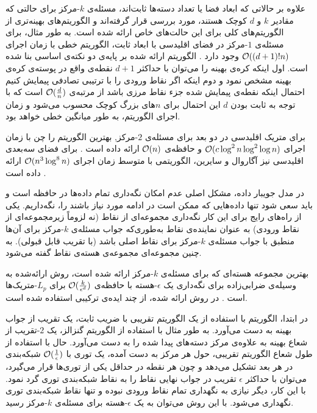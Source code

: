 علاوه بر حالاتی که ابعاد فضا یا تعداد دسته‌ها ثابت‌اند، مسئله‌ی $k$-مرکز برای حالتی که مقادیر $k$ و $d$ کوچک هستند، مورد بررسی قرار گرفته‌اند و الگوریتم‌های بهینه‌تری از الگوریتم‌های کلی برای این حالت‌های خاص ارائه شده است.
به طور مثال، برای مسئله‌ی $1$-مرکز در فضای اقلیدسی با ابعاد ثابت، الگوریتم خطی با زمان اجرای $\mathcal{O}((d+1)! n)$ وجود دارد .
الگوریتم ارائه شده بر پایه‌ی دو نکته‌ی اساسی بنا شده است.
اول اینکه کره‌ی بهینه را می‌توان با حداکثر $d+1$ نقطه‌ی واقع در پوسته‌ی کره‌ی بهینه مشخص نمود و دوم اینکه اگر نقاط ورودی را با ترتیبی تصادفی پیمایش کنیم احتمال اینکه نقطه‌ی پیمایش شده جزء نقاط مرزی باشد از مرتبه‌ی $\mathcal{O}(\frac{d}{n})$ است که با توجه به ثابت بودن $d$ این احتمال برای $n$های بزرگ کوچک محسوب می‌شود و زمان اجرای الگوریتم، به طور میانگین خطی خواهد بود. 


برای متریک اقلیدسی در دو بعد برای مسئله‌ی $2$-مرکز, بهترین الگوریتم را چن با زمان اجرای $\mathcal{O}(c \log^2{n} \log^2{\log{n}})$ و حافظه‌ی $\mathcal{O}(n)$ ارائه داده است .
برای فضای سه‌بعدی اقلیدسی نیز آگاروال و سایرین، الگوریتمی با متوسط زمان اجرای $\mathcal{O}(n^3\log^8{n})$ ارائه داده است .


در مدل جویبار داده، مشکل اصلی عدم امکان نگه‌داری تمام داده‌ها در حافظه است و باید سعی شود تنها داده‌هایی که ممکن است در ادامه مورد نیاز باشند را، نگه‌داریم.
یکی از راه‌های رایج برای این کار نگه‌داری مجموعه‌ای از نقاط (نه لزوماً زیرمجموعه‌ای از نقاط ورودی) به عنوان نماینده‌ی نقاط به‌طوری‌که جواب مسئله‌ی $k$-مرکز برای آن‌ها منطبق با جواب مسئله‌ی $k$-مرکز برای نقاط اصلی باشد (با تقریب قابل قبولی).
به چنین مجموعه‌ای مجموعه‌ی هسته‌ی نقاط گفته می‌شود. 

بهترین مجموعه هسته‌ای که برای مسئله‌ی $k$-مرکز ارائه شده است، روش ارائه‌شده به وسیله‌ی ضرابی‌زاده برای نگه‌داری یک $\epsilon$-هسته با حافظه‌ی $\mathcal{O}(\frac{k}{\epsilon^d})$ برای $L_p$-متریک‌ها است .
در روش ارائه شده، از چند ایده‌ی ترکیبی استفاده شده است. 

در ابتدا، الگوریتم با استفاده از یک الگوریتم تقریبی با ضریب ثابت، یک تقریب از جواب بهینه به دست می‌آورد.
به طور مثال با استفاده از الگوریتم گنزالز، یک $2$-تقریب از شعاع بهینه به علاوه‌ی مرکز دسته‌های پیدا شده را به دست می‌آورد.
حال با استفاده از طول شعاع الگوریتم تقریبی، حول هر مرکز به دست آمده، یک توری با $\mathcal{O}(\frac{1}{\epsilon})$ شبکه‌بندی در هر بعد تشکیل می‌دهد و چون هر نقطه در حداقل یکی از توری‌ها قرار می‌گیرد، می‌توان با حداکثر $\epsilon$ تقریب در جواب نهایی نقاط را به نقاط شبکه‌بندی توری گرد نمود.
با این کار، دیگر نیازی به نگهداری تمام نقاط ورودی نبوده و تنها نقاط شبکه‌بندی توری نگهداری می‌شود.
با این روش می‌توان به یک $\epsilon$-هسته برای مسئله‌ی $k$-مرکز رسید. 

